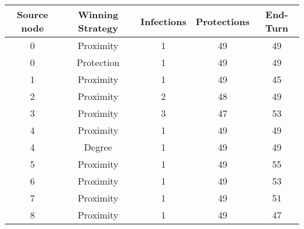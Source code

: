 \documentclass[results.tex]{subfiles}
\begin{document}
    \begin{center}
        \begin{tabular}{| c || c | c | c | c |}
            \hline
            {\bfseries Source node} & {\bfseries Winning Strategy} & {\bfseries Infections} & {\bfseries Protections}
            & {\bfseries End-Turn}
            \\  %
            \hline\hline
            0                       & Proximity                    & 1                      & 49                      & 49                   \\
            \hline
            0                       & Protection                   & 1                      & 49                      & 49                   \\
            \hline
            1                       & Proximity                    & 1                      & 49                      & 45                   \\
            \hline
            2                       & Proximity                    & 2                      & 48                      & 49                   \\
            \hline
            3                       & Proximity                    & 3                      & 47                      & 53                   \\
            \hline
            4                       & Proximity                    & 1                      & 49                      & 49                   \\
            \hline
            4                       & Degree                       & 1                      & 49                      & 49                   \\
            \hline
            5                       & Proximity                    & 1                      & 49                      & 55                   \\
            \hline
            6                       & Proximity                    & 1                      & 49                      & 53                   \\
            \hline
            7                       & Proximity                    & 1                      & 49                      & 51                   \\
            \hline
            8                       & Proximity                    & 1                      & 49                      & 47                   \\

\end{tabular}
\end{center}
\end{document}
